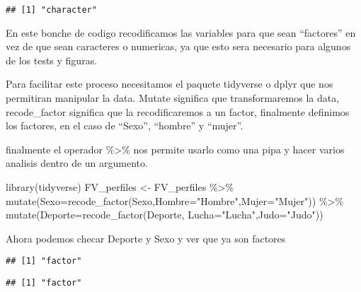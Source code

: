 \documentclass[
]{article}
\newenvironment{Shaded}{\begin{snugshade}}{\end{snugshade}}
\newcommand{\AttributeTok}[1]{\textcolor[rgb]{0.77,0.63,0.00}{#1}}
\newcommand{\FunctionTok}[1]{\textcolor[rgb]{0.00,0.00,0.00}{#1}}
\newcommand{\NormalTok}[1]{#1}
\newcommand{\OtherTok}[1]{\textcolor[rgb]{0.56,0.35,0.01}{#1}}
\newcommand{\SpecialCharTok}[1]{\textcolor[rgb]{0.00,0.00,0.00}{#1}}
\newcommand{\StringTok}[1]{\textcolor[rgb]{0.31,0.60,0.02}{#1}}
\begin{document}
\begin{Shaded}
\end{Shaded}

\begin{verbatim}
## [1] "character"
\end{verbatim}

En este bonche de codigo recodificamos las variables para que sean
``factores'' en vez de que sean caracteres o numericas, ya que esto sera
necesario para algunos de los tests y figuras.

Para facilitar este proceso necesitamos el paquete tidyverse o dplyr que
nos permitiran manipular la data. Mutate significa que transformaremos
la data, recode\_factor significa que la recodificaremos a un factor,
finalmente definimos los factores, en el caso de ``Sexo'', ``hombre'' y
``mujer''.

finalmente el operador \%\textgreater\% nos permite usarlo como una pipa
y hacer varios analisis dentro de un argumento.

\begin{Shaded}
\begin{Highlighting}[]
\FunctionTok{library}\NormalTok{(tidyverse)}
\NormalTok{FV\_perfiles }\OtherTok{\textless{}{-}}\NormalTok{ FV\_perfiles }\SpecialCharTok{\%\textgreater{}\%}
  \FunctionTok{mutate}\NormalTok{(}\AttributeTok{Sexo=}\FunctionTok{recode\_factor}\NormalTok{(Sexo,}\AttributeTok{Hombre=}\StringTok{"Hombre"}\NormalTok{,}\AttributeTok{Mujer=}\StringTok{"Mujer"}\NormalTok{)) }\SpecialCharTok{\%\textgreater{}\%}
  \FunctionTok{mutate}\NormalTok{(}\AttributeTok{Deporte=}\FunctionTok{recode\_factor}\NormalTok{(Deporte,}
                                 \AttributeTok{Lucha=}\StringTok{"Lucha"}\NormalTok{,}\AttributeTok{Judo=}\StringTok{"Judo"}\NormalTok{)) }
\end{Highlighting}
\end{Shaded}

Ahora podemos checar Deporte y Sexo y ver que ya son factores

\begin{Shaded}
\end{Shaded}

\begin{verbatim}
## [1] "factor"
\end{verbatim}

\begin{Shaded}
\end{Shaded}

\begin{verbatim}
## [1] "factor"
\end{verbatim}
\end{document}
